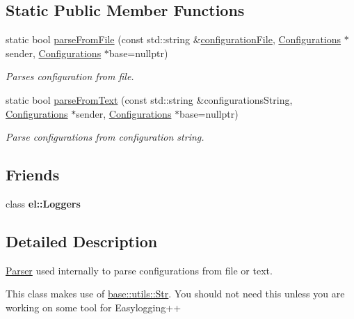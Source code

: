 \subsection*{Static Public Member Functions}
\begin{DoxyCompactItemize}
\item 
static bool \hyperlink{classel_1_1_configurations_1_1_parser_a45def5007bf368c4d2a505af58cd94c2}{parse\+From\+File} (const std\+::string \&\hyperlink{classel_1_1_configurations_a65c89530cf6276fa91c02b00be76b3db}{configuration\+File}, \hyperlink{classel_1_1_configurations}{Configurations} $\ast$sender, \hyperlink{classel_1_1_configurations}{Configurations} $\ast$base=nullptr)
\begin{DoxyCompactList}\small\item\em Parses configuration from file. \end{DoxyCompactList}\item 
static bool \hyperlink{classel_1_1_configurations_1_1_parser_a39ec1b06f673e8155a83d66e08229129}{parse\+From\+Text} (const std\+::string \&configurations\+String, \hyperlink{classel_1_1_configurations}{Configurations} $\ast$sender, \hyperlink{classel_1_1_configurations}{Configurations} $\ast$base=nullptr)
\begin{DoxyCompactList}\small\item\em Parse configurations from configuration string. \end{DoxyCompactList}\end{DoxyCompactItemize}
\subsection*{Friends}
\begin{DoxyCompactItemize}
\item 
\mbox{\label{classel_1_1_configurations_1_1_parser_a6efe246b312d02731fb0e1d120c0331d}} 
class {\bfseries el\+::\+Loggers}
\end{DoxyCompactItemize}


\subsection{Detailed Description}
\hyperlink{classel_1_1_configurations_1_1_parser}{Parser} used internally to parse configurations from file or text. 

This class makes use of \hyperlink{classel_1_1base_1_1utils_1_1_str}{base\+::utils\+::\+Str}. You should not need this unless you are working on some tool for Easylogging++ 

